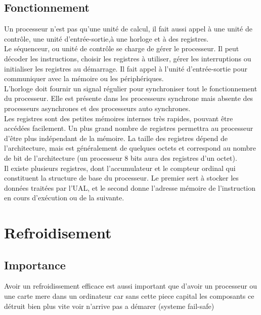 \documentclass[a4paper,12pt]{article}
\begin{document}
        \subsection{Fonctionnement}
            Un processeur n'est pas qu'une unité de calcul, il fait aussi appel à une unité de contrôle, une unité d'entrée-sortie,à une horloge et à des registres. \\
            Le séquenceur, ou unité de contrôle se charge de gérer le processeur. Il peut décoder les instructions, choisir les registres à utiliser, gérer les interruptions ou initialiser les registres au démarrage. Il fait appel à l'unité d'entrée-sortie pour communiquer avec la mémoire ou les périphériques. \\
            L'horloge doit fournir un signal régulier pour synchroniser tout le fonctionnement du processeur. Elle est présente dans les processeurs synchrone mais absente des processeurs asynchrones et des processeurs auto synchrones. \\
            Les registres sont des petites mémoires internes très rapides, pouvant être accédées facilement. Un plus grand nombre de registres permettra au processeur d'être plus indépendant de la mémoire. La taille des registres dépend de l'architecture, mais est généralement de quelques octets et correspond au nombre de bit de l'architecture (un processeur 8 bits aura des registres d'un octet). \\
            Il existe plusieurs registres, dont l'accumulateur et le compteur ordinal qui constituent la structure de base du processeur. Le premier sert à stocker les données traitées par l'UAL\footnotemark[2], et le second donne l'adresse mémoire de l'instruction en cours d'exécution ou de la suivante.
    
    
    \newpage
    
    \section{Refroidisement}
    
        \subsection{Importance}
            Avoir un refroidissement efficace est aussi important que d'avoir un processeur ou une carte mere dans un ordinateur car sans cette piece capital les composants ce détruit bien plus vite voir n'arrive pas a démarer (systeme fail-safe\footnotemark[1])
            
\end{document}
